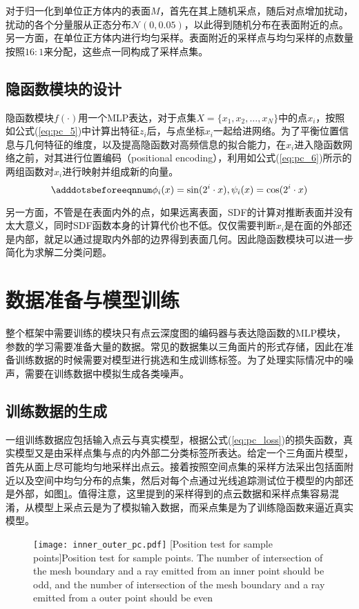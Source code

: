 对于归一化到单位正方体内的表面$M$，首先在其上随机采点，随后对点增加扰动，扰动的各个分量服从正态分布$\mathcal{N}(0, 0.05)$，以此得到随机分布在表面附近的点。另一方面，在单位正方体内进行均匀采样。表面附近的采样点与均匀采样的点数量按照$16:1$来分配，这些点一同构成了采样点集。

\subsection{隐函数模块的设计}
隐函数模块$f(\cdot)$用一个MLP表达，对于点集$X=\{x_1, x_2, \dots, x_N\}$中的点$x_i$，按照如公式(\ref{eq:pc_5})中计算出特征$z_i$后，与点坐标$x_i$一起给进网络。为了平衡位置信息与几何特征的维度，以及提高隐函数对高频信息的拟合能力，在$x_i$进入隐函数网络之前，对其进行位置编码（positional encoding），利用如公式(\ref{eq:pc_6})所示的两组函数对$x_i$进行映射并组成新的向量。
\begin{equation} \label{eq:pc_6}
    \adddotsbeforeeqnnum%
    \phi_i(x) = \sin(2^i \cdot x), \psi_i(x) = \cos(2^i \cdot x)
\end{equation}

另一方面，不管是在表面内外的点，如果远离表面，SDF的计算对推断表面并没有太大意义，同时SDF函数本身的计算代价也不低。仅仅需要判断$x_i$是在面的外部还是内部，就足以通过提取内外部的边界得到表面几何。因此隐函数模块可以进一步简化为求解二分类问题。

\section{数据准备与模型训练}
整个框架中需要训练的模块只有点云深度图的编码器与表达隐函数的MLP模块，参数的学习需要准备大量的数据。常见的数据集以三角面片的形式存储，因此在准备训练数据的时候需要对模型进行挑选和生成训练标签。为了处理实际情况中的噪声，需要在训练数据中模拟生成各类噪声。

\subsection{训练数据的生成}
一组训练数据应包括输入点云与真实模型，根据公式(\ref{eq:pc_loss})的损失函数，真实模型又是由采样点集与点的内外部二分类标签所表达。给定一个三角面片模型，首先从面上尽可能均匀地采样出点云。接着按照空间点集的采样方法采出包括面附近以及空间中均匀分布的点集，然后对每个点通过光线追踪测试位于模型的内部还是外部，如图\ref{fig:pc_inout}。值得注意，这里提到的采样得到的点云数据和采样点集容易混淆，从模型上采点云是为了模拟输入数据，而采点集是为了训练隐函数来逼近真实模型。
\begin{figure}[!htbp]
    \centering
    \texttt{[image: inner\_outer\_pc.pdf]}
    [Position test for sample points]{Position test for sample points. The number of intersection of the mesh boundary  and a ray emitted from an inner point should be odd, and the number of intersection of the mesh boundary and a ray emitted from a outer point should be even}
    \label{fig:pc_inout}
\end{figure}

